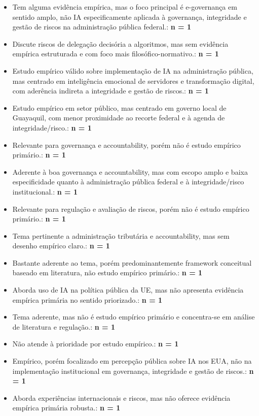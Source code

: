 \documentclass[12pt,a4paper]{article}
\begin{document}
\begin{itemize}
\begin{itemize}
\item Tem alguma evidência empírica, mas o foco principal é e-governança em sentido amplo, não IA especificamente aplicada à governança, integridade e gestão de riscos na administração pública federal.: \textbf{n = 1}
\item Discute riscos de delegação decisória a algoritmos, mas sem evidência empírica estruturada e com foco mais filosófico-normativo.: \textbf{n = 1}
\item Estudo empírico válido sobre implementação de IA na administração pública, mas centrado em inteligência emocional de servidores e transformação digital, com aderência indireta a integridade e gestão de riscos.: \textbf{n = 1}
\item Estudo empírico em setor público, mas centrado em governo local de Guayaquil, com menor proximidade ao recorte federal e à agenda de integridade/risco.: \textbf{n = 1}
\item Relevante para governança e accountability, porém não é estudo empírico primário.: \textbf{n = 1}
\item Aderente à boa governança e accountability, mas com escopo amplo e baixa especificidade quanto à administração pública federal e à integridade/risco institucional.: \textbf{n = 1}
\item Relevante para regulação e avaliação de riscos, porém não é estudo empírico primário.: \textbf{n = 1}
\item Tema pertinente a administração tributária e accountability, mas sem desenho empírico claro.: \textbf{n = 1}
\item Bastante aderente ao tema, porém predominantemente framework conceitual baseado em literatura, não estudo empírico primário.: \textbf{n = 1}
\item Aborda uso de IA na política pública da UE, mas não apresenta evidência empírica primária no sentido priorizado.: \textbf{n = 1}
\item Tema aderente, mas não é estudo empírico primário e concentra-se em análise de literatura e regulação.: \textbf{n = 1}
\item Não atende à prioridade por estudo empírico.: \textbf{n = 1}
\item Empírico, porém focalizado em percepção pública sobre IA nos EUA, não na implementação institucional em governança, integridade e gestão de riscos.: \textbf{n = 1}
\item Aborda experiências internacionais e riscos, mas não oferece evidência empírica primária robusta.: \textbf{n = 1}

\end{itemize}
\end{itemize}
\end{document}
